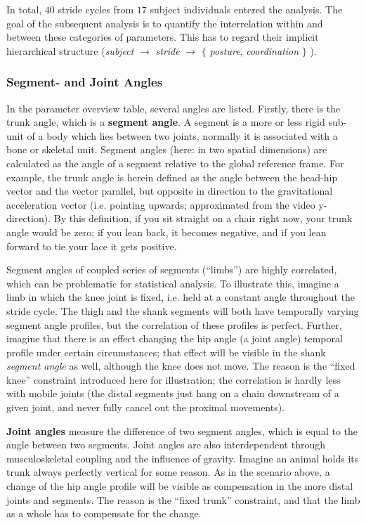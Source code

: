In total, \(40\) stride cycles from \(17\) subject individuals entered the analysis.
The goal of the subsequent analysis is to quantify the interrelation within and between these categories of parameters.
This has to regard their implicit hierarchical structure (\emph{subject} \(\rightarrow\) \emph{stride} \(\rightarrow\) \(\lbrace\) \emph{posture}, \emph{coordination} \(\rbrace\) ).


\subsubsection{Segment- and Joint Angles}
\label{sec:orgd5b5698}
In the parameter overview table, several angles are listed.
Firstly, there is the trunk angle, which is a \textbf{segment angle}.
A segment is a more or less rigid sub-unit of a body which lies between two joints, normally it is associated with a bone or skeletal unit.
Segment angles (here: in two spatial dimensions) are calculated as the angle of a segment relative to the global reference frame.
For example, the trunk angle is herein defined as the angle between the head-hip vector and the vector parallel, but opposite in direction to the gravitational acceleration vector (i.e. pointing upwards; approximated from the video y-direction).
By this definition, if you sit straight on a chair right now, your trunk angle would be zero; if you lean back, it becomes negative, and if you lean forward to tie your lace it gets positive.

Segment angles of coupled series of segments (``limbs'') are highly correlated, which can be problematic for statistical analysis.
To illustrate this, imagine a limb in which the knee joint is fixed, i.e. held at a constant angle throughout the stride cycle.
The thigh and the shank segments will both have temporally varying segment angle profiles, but the correlation of these profiles is perfect.
Further, imagine that there is an effect changing the hip angle (a joint angle) temporal profile under certain circumstances; that effect will be visible in the shank \textit{segment angle} as well, although the knee does not move.
The reason is the ``fixed knee'' constraint introduced here for illustration; the correlation is hardly less with mobile joints (the distal segments just hang on a chain downstream of a given joint, and never fully cancel out the proximal movements).


\textbf{Joint angles} measure the difference of two segment angles, which is equal to the angle between two segments.
Joint angles are also interdependent through musculoskeletal coupling and the influence of gravity.
Imagine an animal holds its trunk always perfectly vertical for some reason.
As in the scenario above, a change of the hip angle profile will be visible as compensation in the more distal joints and segments.
The reason is the ``fixed trunk'' constraint, and that the limb as a whole has to compensate for the change.

